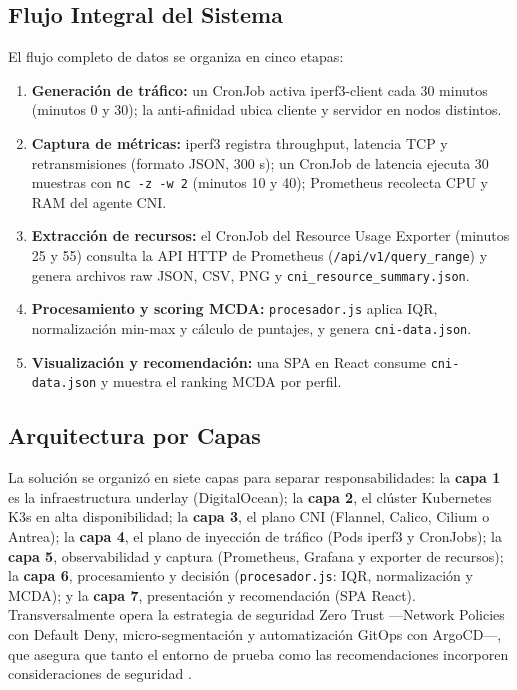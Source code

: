 \subsection{Flujo Integral del Sistema}

El flujo completo de datos se organiza en cinco etapas:
\begin{enumerate}
\item \textbf{Generación de tráfico:} un CronJob activa iperf3-client cada 30 minutos (minutos 0 y 30); la anti-afinidad ubica cliente y servidor en nodos distintos.
\item \textbf{Captura de métricas:} iperf3 registra throughput, latencia TCP y retransmisiones (formato JSON, 300 s); un CronJob de latencia ejecuta 30 muestras con \texttt{nc -z -w 2} (minutos 10 y 40); Prometheus recolecta CPU y RAM del agente CNI.
\item \textbf{Extracción de recursos:} el CronJob del Resource Usage Exporter (minutos 25 y 55) consulta la API HTTP de Prometheus (\texttt{/api/v1/query\_range}) y genera archivos raw JSON, CSV, PNG y \texttt{cni\_resource\_summary.json}.
\item \textbf{Procesamiento y scoring MCDA:} \texttt{procesador.js} aplica IQR, normalización min-max y cálculo de puntajes, y genera \texttt{cni-data.json}.
\item \textbf{Visualización y recomendación:} una SPA en React consume \texttt{cni-data.json} y muestra el ranking MCDA por perfil.
\end{enumerate}

\subsection{Arquitectura por Capas}

La solución se organizó en siete capas para separar responsabilidades: la \textbf{capa 1} es la infraestructura underlay (DigitalOcean); la \textbf{capa 2}, el clúster Kubernetes K3s en alta disponibilidad; la \textbf{capa 3}, el plano CNI (Flannel, Calico, Cilium o Antrea); la \textbf{capa 4}, el plano de inyección de tráfico (Pods iperf3 y CronJobs); la \textbf{capa 5}, observabilidad y captura (Prometheus, Grafana y exporter de recursos); la \textbf{capa 6}, procesamiento y decisión (\texttt{procesador.js}: IQR, normalización y MCDA); y la \textbf{capa 7}, presentación y recomendación (SPA React). Transversalmente opera la estrategia de seguridad Zero Trust ---Network Policies con Default Deny, micro-segmentación y automatización GitOps con ArgoCD---, que asegura que tanto el entorno de prueba como las recomendaciones incorporen consideraciones de seguridad \cite{ref16}.

